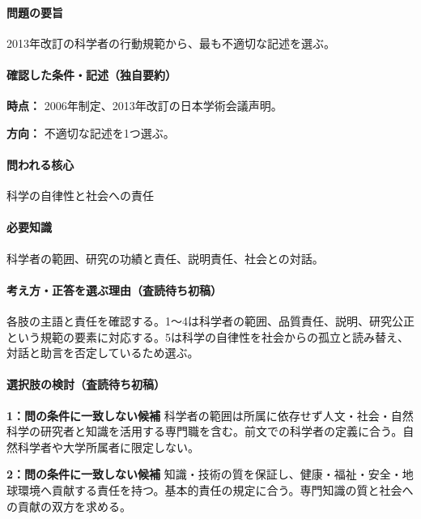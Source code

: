\paragraph{問題の要旨} 2013年改訂の科学者の行動規範から、最も不適切な記述を選ぶ。

\paragraph{確認した条件・記述（独自要約）}\mbox{}\par

\noindent\textbf{時点：} 2006年制定、2013年改訂の日本学術会議声明。\par

\noindent\textbf{方向：} 不適切な記述を1つ選ぶ。\par

\paragraph{問われる核心} 科学の自律性と社会への責任

\paragraph{必要知識} 科学者の範囲、研究の功績と責任、説明責任、社会との対話。

\paragraph{考え方・正答を選ぶ理由（査読待ち初稿）} 各肢の主語と責任を確認する。1〜4は科学者の範囲、品質責任、説明、研究公正という規範の要素に対応する。5は科学の自律性を社会からの孤立と読み替え、対話と助言を否定しているため選ぶ。

\paragraph{選択肢の検討（査読待ち初稿）}\mbox{}\par

\noindent\textbf{1：問の条件に一致しない候補} 科学者の範囲は所属に依存せず人文・社会・自然科学の研究者と知識を活用する専門職を含む。前文での科学者の定義に合う。自然科学者や大学所属者に限定しない。\par

\noindent\textbf{2：問の条件に一致しない候補} 知識・技術の質を保証し、健康・福祉・安全・地球環境へ貢献する責任を持つ。基本的責任の規定に合う。専門知識の質と社会への貢献の双方を求める。\par

